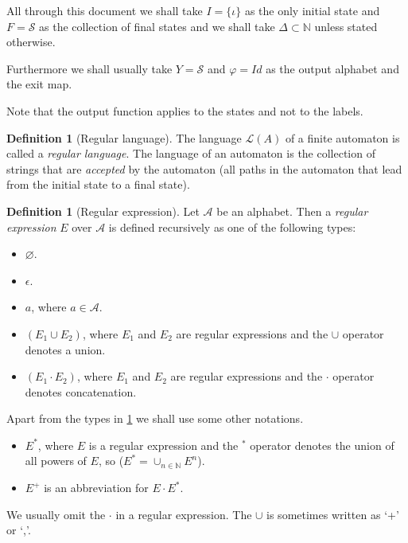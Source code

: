 \documentclass{article}
\theoremstyle{definition}
\newtheorem{definition}[theorem]{Definition}
\begin{document}
All through this document we shall take $I = \{\iota\}$ as the only initial
state and $F = \mathcal{S}$ as the collection of final states and we shall
take $\Delta \subset \mathbb{N}$ unless stated otherwise.

Furthermore we shall usually take $Y = \mathcal{S}$ and $\varphi = Id$ as the
output alphabet and the exit map.

Note that the output function applies to the states and not to the labels.

\begin{definition}[Regular language] \label{def:regular_language}
The language $\mathcal{L}(A)$ of a finite automaton is called a 
\emph{regular language}. The language of an automaton is the collection of
strings that are \emph{accepted} by the automaton (all paths in the automaton
that lead from the initial state to a final state).
\end{definition}

\begin{definition}[Regular expression] \label{def:regular_expression}
Let $\mathcal{A}$ be an alphabet. Then a \emph{regular expression} $E$ over 
$\mathcal{A}$ is defined recursively as one of the following types:
\begin{itemize}
\item $\varnothing$.
\item $\epsilon$.
\item $a$, where $a \in \mathcal{A}$.
\item $(E_1 \cup E_2)$, where $E_1$ and $E_2$ are regular expressions and the
      $\cup$ operator denotes a union.
\item $(E_1 \cdot E_2)$, where $E_1$ and $E_2$ are regular expressions and the
      $\cdot$ operator denotes concatenation.
\end{itemize}
\end{definition}

Apart from the types in \ref{def:regular_expression} we shall use some other 
notations.
\begin{itemize}
\item $E^*$, where $E$ is a regular expression and the $^*$ operator denotes the
      union of all powers of $E$, so ($E^* = \cup_{n \in \mathbb{N}}E^n$).
\item $E^+$ is an abbreviation for $E \cdot E^*$.
\end{itemize}

We usually omit the $\cdot$ in a regular expression. The $\cup$ is sometimes
written as `+' or `,'.
\end{document}
